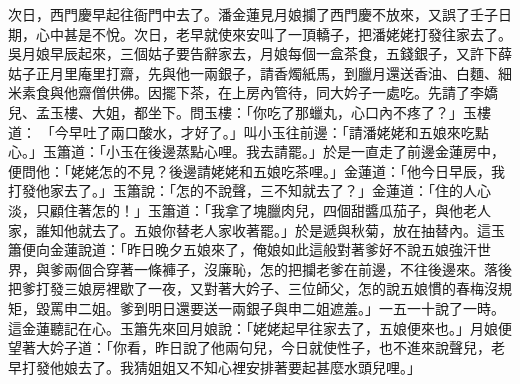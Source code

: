 次日，西門慶早起往衙門中去了。潘金蓮見月娘攔了西門慶不放來，又誤了壬子日期，心中甚是不悅。次日，老早就使來安叫了一頂轎子，把潘姥姥打發往家去了。吳月娘早辰起來，三個姑子要告辭家去，月娘每個一盒茶食，五錢銀子，又許下薛姑子正月里庵里打齋，先與他一兩銀子，請香燭紙馬，到臘月還送香油、白麵、細米素食與他齋僧供佛。因擺下茶，在上房內管待，同大妗子一處吃。先請了李嬌兒、孟玉樓、大姐，都坐下。問玉樓：「你吃了那蠟丸，心口內不疼了？」玉樓道： 「今早吐了兩口酸水，才好了。」叫小玉往前邊：「請潘姥姥和五娘來吃點心。」玉簫道：「小玉在後邊蒸點心哩。我去請罷。」於是一直走了前邊金蓮房中，便問他：「姥姥怎的不見？後邊請姥姥和五娘吃茶哩。」金蓮道：「他今日早辰，我打發他家去了。」玉簫說：「怎的不說聲，三不知就去了？」金蓮道：「住的人心淡，只顧住著怎的！」玉簫道：「我拿了塊臘肉兒，四個甜醬瓜茄子，與他老人家，誰知他就去了。五娘你替老人家收著罷。」於是遞與秋菊，放在抽替內。這玉簫便向金蓮說道：「昨日晚夕五娘來了，俺娘如此這般對著爹好不說五娘強汗世界，與爹兩個合穿著一條褲子，沒廉恥，怎的把攔老爹在前邊，不往後邊來。落後把爹打發三娘房裡歇了一夜，又對著大妗子、三位師父，怎的說五娘慣的春梅沒規矩，毀罵申二姐。爹到明日還要送一兩銀子與申二姐遮羞。」一五一十說了一時。這金蓮聽記在心。玉簫先來回月娘說：「姥姥起早往家去了，五娘便來也。」月娘便望著大妗子道：「你看，昨日說了他兩句兒，今日就使性子，也不進來說聲兒，老早打發他娘去了。我猜姐姐又不知心裡安排著要起甚麼水頭兒哩。」

